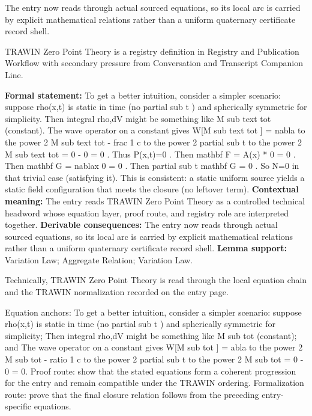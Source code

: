 The entry now reads through actual sourced equations, so its local arc is carried by explicit mathematical relations rather than a uniform quaternary certificate record shell.
\clearpage


\begingroup\small
{}
TRAWIN Zero Point Theory is a registry definition in Registry and Publication Workflow with secondary pressure from Conversation and Transcript Companion Line.

\begingroup\footnotesize\setlength{\emergencystretch}{3em}\sloppy
\textbf{Formal statement:} To get a better intuition, consider a simpler scenario: suppose rho(x,t) is static in time (no partial sub t ) and spherically symmetric for simplicity. Then integral rho,dV might be something like M sub text tot (constant). The wave operator on a constant gives W[M sub text tot ] = nabla to the power 2 M sub text tot - frac 1 c to the power 2 partial sub t to the power 2 M sub text tot = 0 - 0 = 0 . Thus P(x,t)=0 . Then mathbf F = A(x) * 0 = 0 . Then mathbf G = nablax 0 = 0 . Then partial sub t mathbf G = 0 . So N=0 in that trivial case (satisfying it). This is consistent: a static uniform source yields a static field configuration that meets the closure (no leftover term). \textbf{Contextual meaning:} The entry reads TRAWIN Zero Point Theory as a controlled technical headword whose equation layer, proof route, and registry role are interpreted together. \textbf{Derivable consequences:} The entry now reads through actual sourced equations, so its local arc is carried by explicit mathematical relations rather than a uniform quaternary certificate record shell. \textbf{Lemma support:} Variation Law; Aggregate Relation; Variation Law.\par
\endgroup

Technically, TRAWIN Zero Point Theory is read through the local equation chain and the TRAWIN normalization recorded on the entry page.

Equation anchors: To get a better intuition, consider a simpler scenario: suppose rho(x,t) is static in time (no partial sub t ) and spherically symmetric for simplicity; Then integral rho,dV might be something like M sub tot (constant); and The wave operator on a constant gives W[M sub tot ] = abla to the power 2 M sub tot - ratio 1 c to the power 2 partial sub t to the power 2 M sub tot = 0 - 0 = 0. Proof route: show that the stated equations form a coherent progression for the entry and remain compatible under the TRAWIN ordering. Formalization route: prove that the final closure relation follows from the preceding entry-specific equations.

